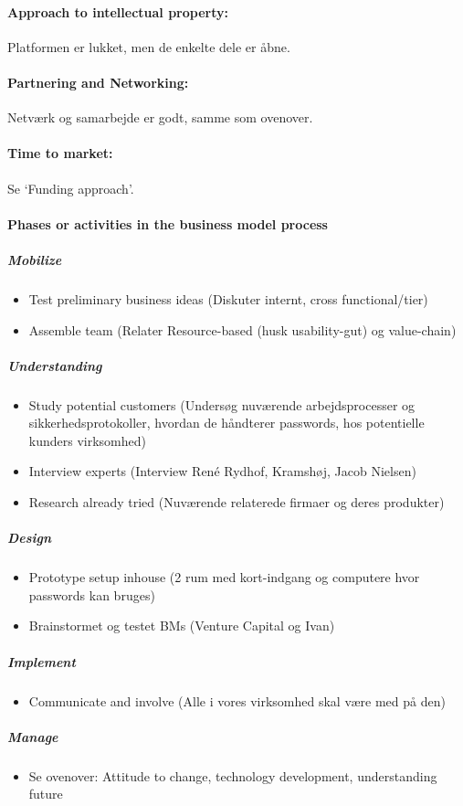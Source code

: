 \paragraph{Approach to intellectual property:} Platformen er lukket, men de enkelte dele er åbne.

\paragraph{Partnering and Networking:} Netværk og samarbejde er godt, samme som ovenover.

\paragraph{Time to market:} Se `Funding approach'.

\paragraph{Phases or activities in the business model process}

\subparagraph{Mobilize}
\begin{itemize}
\item Test preliminary business ideas (Diskuter internt, cross functional/tier)
\item Assemble team (Relater Resource-based (husk usability-gut) og value-chain)
\end{itemize}

\subparagraph{Understanding}
\begin{itemize}
\item Study potential customers (Undersøg nuværende arbejdsprocesser og sikkerhedsprotokoller, hvordan de håndterer passwords, hos potentielle kunders virksomhed)
\item Interview experts (Interview René Rydhof, Kramshøj, Jacob Nielsen)
\item Research already tried (Nuværende relaterede firmaer og deres produkter)
\end{itemize}

\subparagraph{Design}
\begin{itemize}
\item Prototype setup inhouse (2 rum med kort-indgang og computere hvor passwords kan bruges)
\item Brainstormet og testet BMs (Venture Capital og Ivan)
\end{itemize}

\subparagraph{Implement}
\begin{itemize}
  \item Communicate and involve (Alle i vores virksomhed skal være med på den)
\end{itemize}

\subparagraph{Manage}
\begin{itemize}
  \item Se ovenover: Attitude to change, technology development, understanding future
\end{itemize}

